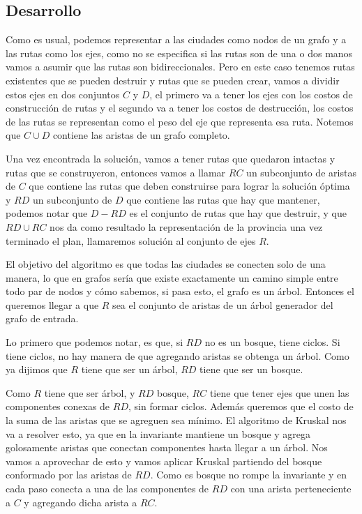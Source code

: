 \subsection{Desarrollo}
Como es usual, podemos representar a las ciudades como nodos de un grafo y a las rutas como los ejes, como no se especifica si las rutas son de una o dos manos vamos a asumir que las rutas son bidireccionales. Pero en este caso tenemos rutas existentes que se pueden destruir y rutas que se pueden crear, vamos a dividir estos ejes en dos conjuntos $C$ y $D$, el primero va a tener los ejes con los costos de construcción de rutas y el segundo va a tener los costos de destrucción, los costos de las rutas se representan como el peso del eje que representa esa ruta. Notemos que $C \cup D$ contiene las aristas de un grafo completo. %
\\
\par
Una vez encontrada la solución, vamos a tener rutas que quedaron intactas y rutas que se construyeron, entonces vamos a llamar $RC$ un subconjunto de aristas de $C$ que contiene las rutas que deben construirse para lograr la solución óptima y $RD$ un subconjunto de $D$ que contiene las rutas que hay que mantener, podemos notar que $D - RD$ es el conjunto de rutas que hay que destruir, y que $RD \cup RC$ nos da como resultado la representación de la provincia una vez terminado el plan, llamaremos solución al conjunto de ejes $R$. %
\\
\par
El objetivo del algoritmo es que todas las ciudades se conecten solo de una manera, lo que en grafos sería que existe exactamente un camino simple entre todo par de
nodos y cómo sabemos, si pasa esto, el grafo es un árbol. Entonces el queremos llegar a que $R$ sea el conjunto de aristas de un árbol generador del grafo de entrada. %
\\
\par
Lo primero que podemos notar, es que, si $RD$ no es un bosque, tiene ciclos. Si tiene ciclos, no hay manera de que agregando aristas se obtenga un árbol. Como ya dijimos que $R$ tiene que ser un árbol, $RD$ tiene que ser un bosque. %
\\
\par
Como $R$ tiene que ser árbol, y $RD$ bosque, $RC$ tiene que tener ejes que unen las componentes conexas de $RD$, sin formar ciclos.  Además queremos que el costo de la suma de las aristas que se agreguen sea mínimo. El algoritmo de Kruskal nos va a resolver esto, ya que en la invariante mantiene un bosque y agrega golosamente aristas que conectan componentes hasta llegar a un árbol. Nos vamos a aprovechar de esto y vamos aplicar Kruskal partiendo del bosque conformado por las aristas de $RD$. Como es bosque no rompe la invariante y en cada paso conecta a una de las componentes de $RD$ con una arista perteneciente a $C$ y agregando dicha arista a $RC$. %
